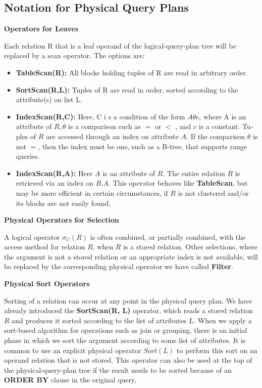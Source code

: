 \subsection{Notation for Physical Query Plans}

\par \textbf{Operators for Leaves}
\par Each relation R that is a leaf operand of the logical-query-plan tree will be replaced by a scan operator. The options are:
\begin{itemize}
    \item \textbf{TableScan(R):} All blocks holding tuples of R are read in arbitrary order.
    \item \textbf{SortScan(R,L):} Tuples of R are read in order, sorted according to the attribute(s) on list L.
    \item \textbf{IndexScan(R,C):} Here, C i s a condition of the form $A\theta c$, where A is an attribute of $R, \theta$ is a comparison such as $=$ or $<$ , and $c$ is a constant. Tu­ples of $R$ are accessed through an index on attribute $A$. If the comparison $\theta$ is not $=$, then the index must be one, such as a B-tree, that supports range queries.
    \item \textbf{IndexScan(R,A):} Here $A$ is an attribute of $R$. The entire relation $R$ is retrieved via an index on $R.A.$ This operator behaves like \textbf{TableScan}, but may be more efficient in certain circumstances, if $R$ is not clustered and/or its blocks are not easily found.
\end{itemize}

\par \textbf{Physical Operators for Selection}
\par A logical operator $\sigma_C(R)$ is often combined, or partially combined, with the access method for relation $R$, when $R$ is a stored relation. Other selections, where the argument is not a stored relation or an appropriate index is not available, will be replaced by the corresponding physical operator we have called \textbf{Filter}.

\par \textbf{Physical Sort Operators}
\par Sorting of a relation can occur at any point in the physical query plan. We have already introduced the \textbf{SortScan(R, L)} operator, which reads a stored relation $R$ and produces it sorted according to the list of attributes $L$. When we apply a sort-based algorithm for operations such as join or grouping, there is an initial phase in which we sort the argument according to some list of attributes. It is common to use an explicit physical operator $Sort(L)$ to perform this sort on an operand relation that is not stored. This operator can also be used at the top of the physical-query-plan tree if the result needs to be sorted because of an \textbf{ORDER BY} clause in the original query,

